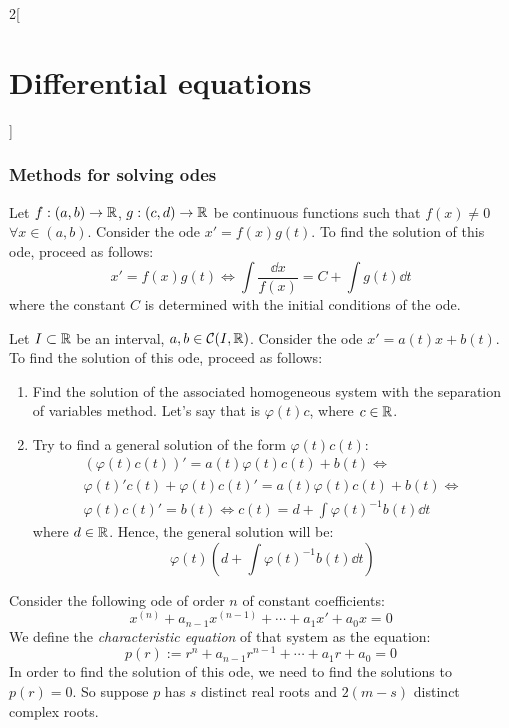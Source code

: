 \documentclass[../../../main_math.tex]{subfiles}
\begin{document}
\begin{multicols}{2}[\section{Differential equations}]
  \subsubsection{Methods for solving odes}
  \begin{method}
    Let $f:(a,b)\rightarrow\mathbb{R}$, $g:(c,d)\rightarrow\mathbb{R}$ be continuous functions such that $f(x)\ne 0$ $\forall x\in (a,b)$. Consider the ode $x'=f(x)g(t)$. To find the solution of this ode, proceed as follows:
    $$x'=f(x)g(t)\iff \int\frac{\dd{x}}{f(x)}=C+\int g(t)\dd{t}$$ where the constant $C$ is determined with the initial conditions of the ode.
  \end{method}
  \begin{method}
    Let $I\subset \mathbb{R}$ be an interval, $a,b\in\mathcal{C}(I,\mathbb{R})$. Consider the ode $x'=a(t)x+b(t)$. To find the solution of this ode, proceed as follows:
    \begin{enumerate}
      \item Find the solution of the associated homogeneous system with the separation of variables method. Let's say that is $\varphi(t)c$, where $c\in\mathbb{R}$.
      \item Try to find a general solution of the form $\varphi(t)c(t)$:
            \begin{multline*}
              \left(\varphi(t)c(t)\right)'=a(t)\varphi(t)c(t)+b(t)\iff\\\varphi(t)'c(t)+\varphi(t)c(t)'=a(t)\varphi(t)c(t)+b(t)\iff\\\varphi(t)c(t)'=b(t)\iff c(t)=d+\int\varphi(t)^{-1}b(t)\dd{t}
            \end{multline*}
            where $d\in\mathbb{R}$. Hence, the general solution will be: $$\varphi(t)\left(d+\int\varphi(t)^{-1}b(t)\dd{t}\right)$$
    \end{enumerate}
  \end{method}
  \begin{method}
    Consider the following ode of order $n$ of constant coefficients:
    \begin{equation}\label{DE_char}
      x^{(n)} + a_{n-1}x^{(n-1)} + \cdots + a_1 x' + a_0 x = 0
    \end{equation}
    We define the \emph{characteristic equation} of that system as the equation: $$p(r):=r^n + a_{n-1}r^{n-1} + \cdots + a_1 r + a_0 = 0$$
    In order to find the solution of this ode, we need to find the solutions to $p(r)=0$. So suppose $p$ has $s$ distinct real roots and $2(m-s)$ distinct complex roots.

\end{method}
\end{multicols}
\end{document}
